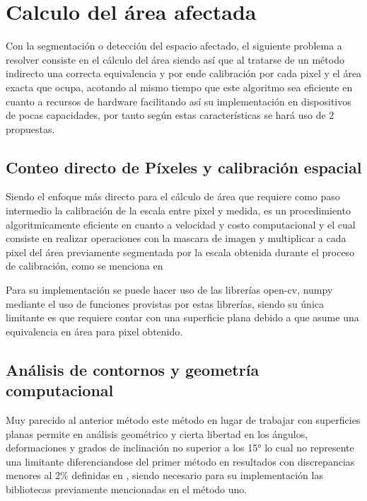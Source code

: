 \section{Calculo del área afectada}

Con la segmentación o detección del espacio afectado, el siguiente problema a resolver consiste en el cálculo del área siendo así que al tratarse de un método indirecto una correcta equivalencia y por ende calibración por cada pixel y el área exacta que ocupa, acotando al mismo tiempo que este algoritmo sea eficiente en cuanto a recursos de hardware facilitando así su implementación en dispositivos de pocas capacidades, por tanto según estas características se hará uso de 2 propuestas.

\subsection{Conteo directo de Píxeles y calibración espacial}

Siendo el enfoque más directo para el cálculo de área que requiere como paso intermedio la calibración de la escala entre pixel y medida, es un procedimiento algoritmicamente eficiente en cuanto a velocidad y costo computacional y el cual consiste en realizar operaciones con la mascara de imagen y multiplicar a cada pixel del área previamente segmentada por la escala obtenida durante el proceso de calibración, como se menciona en \cite{famaf2025procesamiento}

Para su implementación se puede hacer uso de las librerías open-cv, numpy mediante el uso de funciones provistas por estas librerías, siendo su única limitante es que requiere contar con una superficie plana debido a que asume una equivalencia en área para pixel obtenido.

\subsection{Análisis de contornos y geometría computacional}

Muy parecido al anterior método este método en lugar de trabajar con superficies planas permite en análisis geométrico y cierta libertad en los ángulos, deformaciones y grados de inclinación no superior a los 15° lo cual no represente una limitante diferenciandose del primer método en resultados con discrepancias menores al 2\% definidas en \cite{caselles2005contornos}, siendo necesario para su implementación las bibliotecas previamente mencionadas en el método uno.


